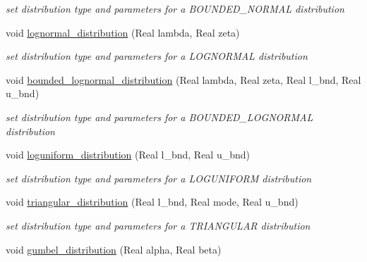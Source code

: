 \begin{DoxyCompactItemize}
\begin{DoxyCompactList}\small\item\em set distribution type and parameters for a B\+O\+U\+N\+D\+E\+D\+\_\+\+N\+O\+R\+M\+AL distribution \end{DoxyCompactList}\item 
void \hyperlink{classPecos_1_1NumericGenOrthogPolynomial_ab467d60674465716b7a4b958e4c48875}{lognormal\+\_\+distribution} (Real lambda, Real zeta)\label{classPecos_1_1NumericGenOrthogPolynomial_ab467d60674465716b7a4b958e4c48875}

\begin{DoxyCompactList}\small\item\em set distribution type and parameters for a L\+O\+G\+N\+O\+R\+M\+AL distribution \end{DoxyCompactList}\item 
void \hyperlink{classPecos_1_1NumericGenOrthogPolynomial_aaa0279e513aed19ffce83c78553c1b8c}{bounded\+\_\+lognormal\+\_\+distribution} (Real lambda, Real zeta, Real l\+\_\+bnd, Real u\+\_\+bnd)\label{classPecos_1_1NumericGenOrthogPolynomial_aaa0279e513aed19ffce83c78553c1b8c}

\begin{DoxyCompactList}\small\item\em set distribution type and parameters for a B\+O\+U\+N\+D\+E\+D\+\_\+\+L\+O\+G\+N\+O\+R\+M\+AL distribution \end{DoxyCompactList}\item 
void \hyperlink{classPecos_1_1NumericGenOrthogPolynomial_afcfe468921c964e1935b9ed42990e51f}{loguniform\+\_\+distribution} (Real l\+\_\+bnd, Real u\+\_\+bnd)\label{classPecos_1_1NumericGenOrthogPolynomial_afcfe468921c964e1935b9ed42990e51f}

\begin{DoxyCompactList}\small\item\em set distribution type and parameters for a L\+O\+G\+U\+N\+I\+F\+O\+RM distribution \end{DoxyCompactList}\item 
void \hyperlink{classPecos_1_1NumericGenOrthogPolynomial_aa3e5afc92b1c583b0d0c3097074b862c}{triangular\+\_\+distribution} (Real l\+\_\+bnd, Real mode, Real u\+\_\+bnd)\label{classPecos_1_1NumericGenOrthogPolynomial_aa3e5afc92b1c583b0d0c3097074b862c}

\begin{DoxyCompactList}\small\item\em set distribution type and parameters for a T\+R\+I\+A\+N\+G\+U\+L\+AR distribution \end{DoxyCompactList}\item 
void \hyperlink{classPecos_1_1NumericGenOrthogPolynomial_a5a1cab747675e9bf5fef2d5a34acd23b}{gumbel\+\_\+distribution} (Real alpha, Real beta)\label{classPecos_1_1NumericGenOrthogPolynomial_a5a1cab747675e9bf5fef2d5a34acd23b}


\end{DoxyCompactItemize}
